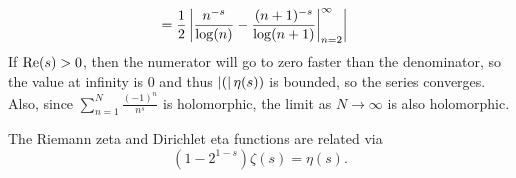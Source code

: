 \documentclass{homework}
\begin{document}
\begin{solution}
\begin{align*}
                                                                                                                                                              &= \frac{1}{2}\left|\frac{n^{-s}}{\log(n)} - \frac{(n + 1)^{-s}}{\log(n+1)} \bigg|_{n=2}^\infty\right|
                                                                                                                                                              \end{align*}
                                                                                                                                                              If $\operatorname{Re}(s)>0$, then the numerator will go to zero faster than the denominator, so the value at infinity is 0 and thus $\left|(\right|\eta(s))$ is bounded, so the series converges. Also, since $\sum_{n=1}^N \frac{(-1)^n}{n^s}$ is holomorphic, the limit as $N\to \infty$ is also holomorphic.
                                                                                                                                                              \end{solution}
                                                                                                                                                              \begin{problem}
                                                                                                                                                                The Riemann zeta and Dirichlet eta functions are related via
                                                                                                                                                                  \[
                                                                                                                                                                      \left( 1 - 2^{1-s} \right) \zeta(s) = \eta(s).
                                                                                                                                                                        \]
                                                                                                                                                                        \end{problem}
\end{document}

